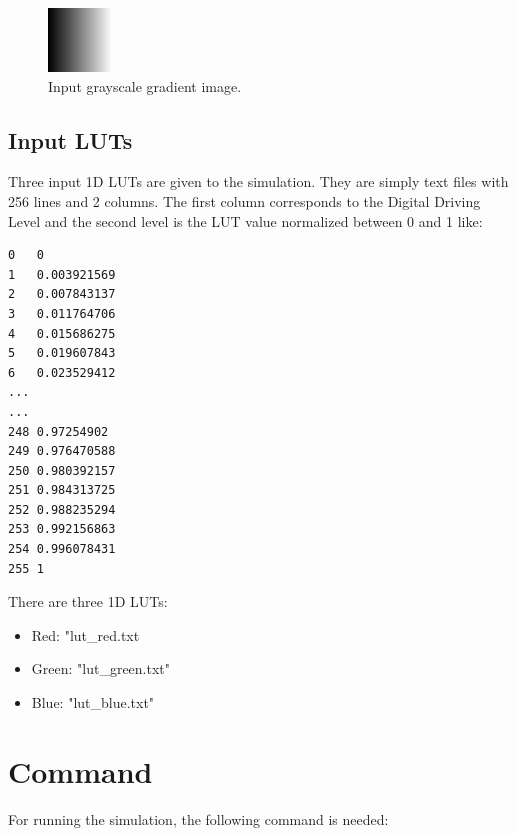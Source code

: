 \begin{figure}[!htb]
\begin{center}
\includegraphics[width=0.5\columnwidth]{./01_Apply3x1DLutModule/images/24RGBL.png}
\caption{Input grayscale gradient image.}\label{fig:gradientRGB}
\end{center}
\end{figure}

\subsection{Input LUTs}

Three input 1D LUTs are given to the simulation. They are simply text files with 256 lines and 2 columns. The first column corresponds to the Digital Driving Level and the second level is the LUT value normalized between 0 and 1 like:

\lstset{language=Scilab}
\begin{lstlisting}
0	0
1	0.003921569
2	0.007843137
3	0.011764706
4	0.015686275
5	0.019607843
6	0.023529412
...
...
248	0.97254902
249	0.976470588
250	0.980392157
251	0.984313725
252	0.988235294
253	0.992156863
254	0.996078431
255	1
\end{lstlisting}

There are three 1D LUTs:
\begin{itemize}
\item Red: "lut\_red.txt
\item Green: "lut\_green.txt"
\item Blue: "lut\_blue.txt"
\end{itemize}

\section{Command}

For running the simulation, the following command is needed:

